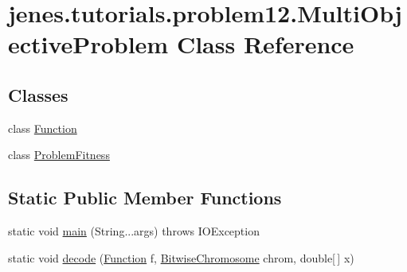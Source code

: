 \hypertarget{classjenes_1_1tutorials_1_1problem12_1_1_multi_objective_problem}{\section{jenes.\-tutorials.\-problem12.\-Multi\-Objective\-Problem Class Reference}
\label{classjenes_1_1tutorials_1_1problem12_1_1_multi_objective_problem}
}
\subsection*{Classes}
\begin{DoxyCompactItemize}
\item 
class \hyperlink{classjenes_1_1tutorials_1_1problem12_1_1_multi_objective_problem_1_1_function}{Function}
\item 
class \hyperlink{classjenes_1_1tutorials_1_1problem12_1_1_multi_objective_problem_1_1_problem_fitness}{Problem\-Fitness}
\end{DoxyCompactItemize}
\subsection*{Static Public Member Functions}
\begin{DoxyCompactItemize}
\item 
static void \hyperlink{classjenes_1_1tutorials_1_1problem12_1_1_multi_objective_problem_a8e1b0d92b909d867c5b21b7c8eb866cb}{main} (String...\-args)  throws I\-O\-Exception 
\item 
static void \hyperlink{classjenes_1_1tutorials_1_1problem12_1_1_multi_objective_problem_ad2990b1d319fa2357e088d12e32f6634}{decode} (\hyperlink{classjenes_1_1tutorials_1_1problem12_1_1_multi_objective_problem_1_1_function}{Function} f, \hyperlink{classjenes_1_1chromosome_1_1_bitwise_chromosome}{Bitwise\-Chromosome} chrom, double\mbox{[}$\,$\mbox{]} x)
\end{DoxyCompactItemize}
